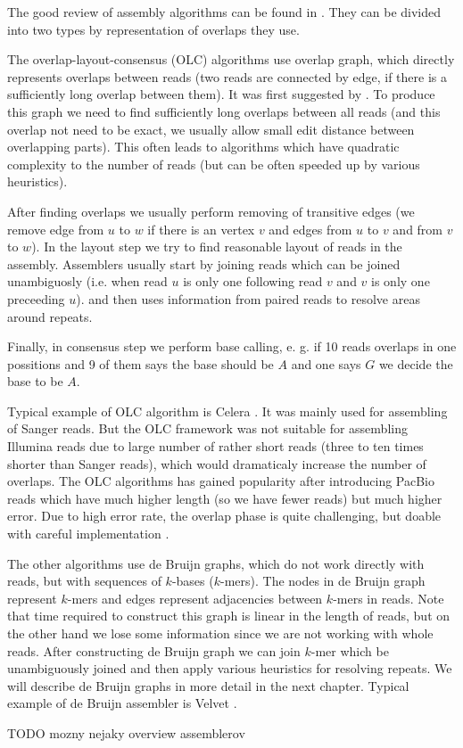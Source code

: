 The good review of assembly algorithms can be found in \citet{miller2010assembly}.
They can be divided into two types by representation of overlaps they use.

The overlap-layout-consensus (OLC) algorithms use overlap graph, which directly represents
overlaps between reads (two reads are connected by edge, if there is a sufficiently long overlap between them). It was first suggested by \citet{myers1995toward}.
To produce this graph we need to find sufficiently long
overlaps between all reads (and this overlap not need to be exact, we usually allow small edit distance between overlapping parts). This often leads to algorithms which have quadratic
complexity to the number of reads (but can be often speeded up by various heuristics).

After finding overlaps we usually perform removing of transitive edges (we remove edge
from $u$ to $w$ if there is an vertex $v$ and edges from $u$ to $v$ and from $v$ to $w$).
In the layout step we try to find reasonable layout of reads in the assembly.
Assemblers usually start by joining reads which can be joined unambiguosly (i.e.
when read $u$ is only one following read $v$ and $v$ is only one preceeding $u$).
and then uses information from paired reads to resolve areas around repeats.

Finally, in consensus step we perform base calling, e. g. if 10 reads overlaps in
one possitions and 9 of them says the base should be $A$ and one says $G$ we decide the base to
be $A$.

Typical example of OLC algorithm is Celera \citep{Celera}.
It was mainly used for assembling of Sanger reads. But the OLC
framework was not suitable for assembling Illumina reads due to large number
of rather short reads (three to ten times shorter than Sanger reads), which
would dramaticaly increase the number of overlaps. 
The OLC algorithms has gained popularity after introducing PacBio reads
which have much higher length (so we have fewer reads) but much higher error.
Due to high error rate, the overlap phase is quite challenging, but
doable with careful implementation \citep{myers2014efficient}. 

\bigskip

The other algorithms use de Bruijn graphs, which do not work directly with reads, but
with sequences of $k$-bases ($k$-mers). The nodes in de Bruijn graph represent $k$-mers
and edges represent adjacencies between $k$-mers in reads. Note that time
required to construct this graph is linear in the length of reads, but on the other hand
we lose some information since we are not working with whole reads.
After constructing de Bruijn graph we can join $k$-mer which be
unambiguously joined and then apply various heuristics for resolving repeats.
We will describe de Bruijn graphs in more detail in the next chapter.
Typical example of de Bruijn assembler is Velvet \citep{Velvet}.

\bigskip
TODO mozny nejaky overview assemblerov
